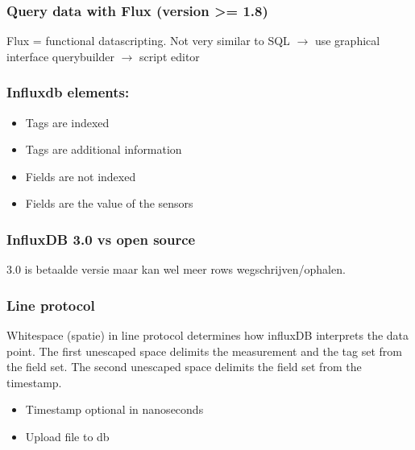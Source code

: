 \documentclass[12pt]{article}
\begin{document}
\subsubsection{Query data with Flux (version >= 1.8)}
Flux = functional datascripting. Not very similar to SQL $\rightarrow$ use graphical interface querybuilder $\rightarrow$ script editor
\subsubsection{Influxdb elements:}\begin{itemize}
    \item Tags are indexed 
    \item Tags are additional information 
    \item Fields are not indexed 
    \item Fields are the value of the sensors
\end{itemize}
\subsubsection{InfluxDB 3.0 vs open source}
3.0 is betaalde versie maar kan wel meer rows wegschrijven/ophalen.
\subsubsection{Line protocol}
Whitespace (spatie) in line protocol determines how influxDB interprets the data point. The first unescaped space delimits the measurement and the tag set from the field set. The second unescaped space delimits the field set from the timestamp.
\begin{itemize}
    \item Timestamp optional in nanoseconds 
    \item Upload file to db
\end{itemize}
\end{document}
